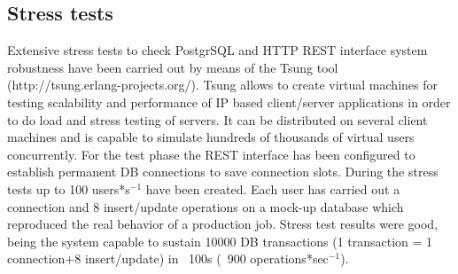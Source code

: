 \documentclass[a4paper]{jpconf}
\begin{document}
\subsection{Stress tests}
Extensive stress tests to check PostgrSQL and HTTP REST interface system robustness have been carried out by means of the Tsung tool (http://tsung.erlang-projects.org/). Tsung allows to create virtual machines for testing scalability and performance of IP based client/server applications in order to do load and stress testing of servers. It can be distributed on several client machines and is capable to simulate hundreds of thousands of virtual users concurrently. For the test phase the REST interface has been configured to establish permanent DB
connections to save connection slots. During the stress tests up to 100 users*s$^{-1}$ have been created. Each user has carried out a connection and 8 insert/update operations on a mock-up database which reproduced the real behavior of a production job. Stress test results were good, being the system capable to sustain 10000 DB transactions (1 transaction = 1 connection+8 insert/update) in ~100s
(~900 operations*sec$^{-1}$).
\end{document}
